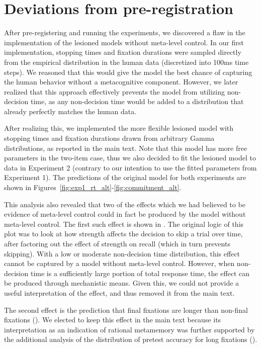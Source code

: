 

\section{Deviations from pre-registration}\label{app:deviation}

After pre-registering and running the experiments, we discovered a flaw in the implementation of the lesioned models without meta-level control. In our first implementation, stopping times and fixation durations were sampled directly from the empirical distribution in the human data (discretized into 100ms time steps). We reasoned that this would give the model the best chance of capturing the human behavior without a metacognitive component. However, we later realized that this approach effectively prevents the model from utilizing non-decision time, as any non-decision time would be added to a distribution that already perfectly matches the human data.

After realizing this, we implemented the more flexible lesioned model with stopping times and fixation durations drawn from arbitrary Gamma distributions, as reported in the main text. Note that this model has more free parameters in the two-item case, thus we also decided to fit the lesioned model to data in Experiment 2 (contrary to our intention to use the fitted parameters from Experiment 1). The predictions of the original model for both experiments are shown in Figures~\ref{fig:exp1_rt_alt}-\ref{fig:commitment_alt}.

This analysis also revealed that two of the effects which we had believed to be evidence of meta-level control could in fact be produced by the model without meta-level control. The first such effect is shown in . The original logic of this plot was to look at how strength affects the decision to skip a trial over time, after factoring out the effect of strength on recall (which in turn prevents skipping). With a low or moderate non-decision time distribution, this effect cannot be captured by a model without meta-level control. However, when non-decision time is a sufficiently large portion of total response time, the effect can be produced through mechanistic means. Given this, we could not provide a useful interpretation of the effect, and thus removed it from the main text.

The second effect is the prediction that final fixations are longer than non-final fixations (). We elected to keep this effect in the main text because its interpretation as an indication of rational metamemory was further supported by the additional analysis of the distribution of pretest accuracy for long fixations ().

